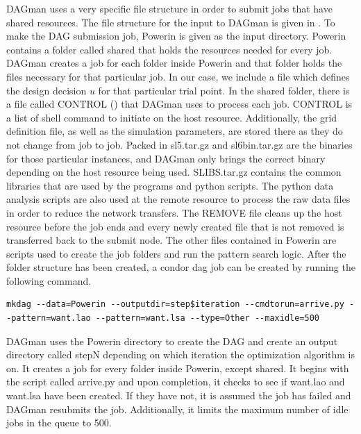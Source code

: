 DAGman uses a very specific file structure in order to submit jobs that have shared resources.  The file structure for the input to DAGman is given in .  To make the DAG submission job, Powerin is given as the input directory.  Powerin contains a folder called shared that holds the resources needed for every job.  DAGman creates a job for each folder inside Powerin and that folder holds the files necessary for that particular job.  In our case, we include a  file which defines the design decision $u$ for that particular trial point.  In the shared folder, there is a file called CONTROL () that DAGman uses to process each job.  CONTROL is a list of shell command to initiate on the host resource. 
\linespread{1}
\linespread{2}
 Additionally, the grid definition file, as well as the simulation parameters, are stored there as they do not change from job to job.  Packed in sl5.tar.gz and sl6bin.tar.gz are the binaries for those particular instances, and DAGman only brings the correct binary depending on the host resource being used.  SLIBS.tar.gz contains the common libraries that are used by the programs and python scripts.  The python data analysis scripts are also used at the remote resource to process the raw data files in order to reduce the network transfers.  The REMOVE file cleans up the host resource before the job ends and every newly created file that is not removed is transferred back to the submit node.  The other files contained in Powerin are scripts used to create the job folders and run the pattern search logic.  After the folder structure has been created, a condor dag job can be created by running the following command.
\begin{lstlisting}
mkdag --data=Powerin --outputdir=step$iteration --cmdtorun=arrive.py --pattern=want.lao --pattern=want.lsa --type=Other --maxidle=500
\end{lstlisting}
DAGman uses the Powerin directory to create the DAG and create an output directory called stepN depending on which iteration the optimization algorithm is on.  It creates a job for every folder inside Powerin, except shared.  It begins with the script called arrive.py and upon completion, it checks to see if want.lao and want.lsa have been created.  If they have not, it is assumed the job has failed and DAGman resubmits the job.  Additionally, it limits the maximum number of idle jobs in the queue to 500.

